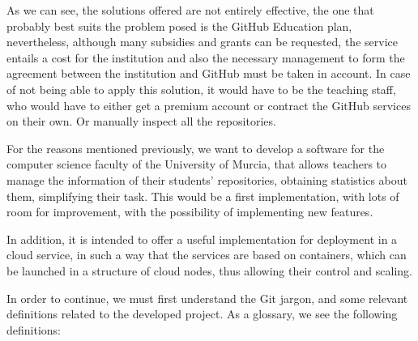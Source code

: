 As we can see, the solutions offered are not entirely effective, the one
that probably best suits the problem posed is the GitHub Education plan,
nevertheless, although many subsidies and grants can be requested, the
service entails a cost for the institution and also the necessary
management to form the agreement between the institution and GitHub must be
taken in account. In case of not being able to apply this solution, it
would have to be the teaching staff, who would have to either get a premium
account or contract the GitHub services on their own. Or manually inspect
all the repositories.

For the reasons mentioned previously, we want to develop a software for the
computer science faculty of the University of Murcia, that allows teachers
to manage the information of their students' repositories, obtaining
statistics about them, simplifying their task. This would be a first
implementation, with lots of room for improvement, with the possibility of
implementing new features.

In addition, it is intended to offer a useful implementation for deployment
in a cloud service, in such a way that the services are based on
containers, which can be launched in a structure of cloud nodes, thus
allowing their control and scaling.

In order to continue, we must first understand the Git jargon, and some
relevant definitions related to the developed project. As a glossary, we
see the following definitions:

